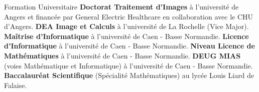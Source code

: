 

\begin{rubric}{Formation Universitaire}
  \entry*[2004--2008]%
  \textbf{Doctorat Traitement d'Images} à l'université de Angers et financée par General Electric Healthcare en collaboration avec le CHU d'Angers.
  \entry*[2003--2004]%
  \textbf{DEA Image et Calculs} à l'université de La Rochelle (Vice Major).
  \entry*[2001--2003]%
  \textbf{Maîtrise d'Informatique} à l'université de Caen - Basse Normandie. 
  \entry*[2000--2001]%
  \textbf{Licence d'Informatique} à l'université de Caen - Basse Normandie. 
  \entry*[1998-2000]%
  \textbf{Niveau Licence de Mathématiques} à l'université de Caen - Basse Normandie.
  \entry*[1996-1998]%
  \textbf{DEUG MIAS} (voies Mathématique et Informatique) à l'université de Caen - Basse Normandie.
  \entry*[1996]%
  \textbf{Baccalauréat Scientifique} (Spécialité Mathématiques) au lycée Louis Liard de Falaise.
\end{rubric}


%
